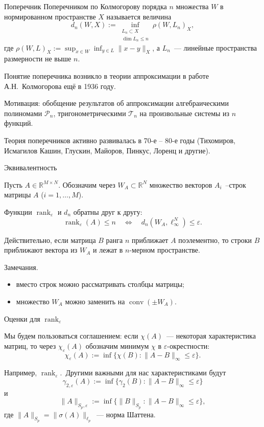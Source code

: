 \documentclass[handout]{beamer}
\renewcommand\le{\leqslant}
\newcommand\R{\mathbb R}
\newcommand\eps{\varepsilon}
\DeclareMathOperator{\conv}{conv}
\DeclareMathOperator{\rank}{rank}
\begin{document}
\begin{frame}{Поперечник}
Поперечником по Колмогорову порядка $n$ множества $W$ в нормированном
    пространстве $X$ называется величина
    \pause
$$
d_n(W,X) := \inf_{\substack{L_n\subset X\\\dim L_n\le n}} \rho(W,L_n)_X,
$$
где $\rho(W,L)_X := \sup_{x\in W}\inf_{y\in L} \|x-y\|_X$, а $L_n$~---
    линейные пространства размерности не выше $n$.
\pause\vspace{5pt}

Понятие поперечника возникло в теории аппроксимации в работе А.Н.~Колмогорова
    ещё в 1936 году.\pause

    Мотивация: обобщение результатов об аппроксимации алгебраическими полиномами
    $\mathcal P_n$, тригонометрическими $\mathcal T_n$ на произвольные системы
    из $n$ функций.
    \pause

    Теория поперечников активно развивалась в 70-е -- 80-е годы (Тихомиров, Исмагилов
    Кашин, Глускин, Майоров, Пинкус, Лоренц и другие).

\end{frame}


\begin{frame}{Эквивалентность}

    Пусть $A\in\R^{M\times N}$. Обозначим через $W_A\subset \R^N$ множество
    векторов $A_i$~--строк матрицы $A$ ($i=1,\ldots,M$). 
    \pause\vspace{5pt}
    
    Функции $\rank_\eps$ и $d_n$ обратны друг к другу:
    $$
    \rank_\eps(A) \le n \quad \Longleftrightarrow \quad d_n(W_A,\ell_\infty^N) \le
    \eps.
    $$
    \pause\vspace{5pt}

    Действительно, если матрица $B$ ранга $n$ приближает $A$ поэлементно, то строки $B$
    приближают вектора из $W_A$ и лежат в $n$-мерном пространстве.
    \pause

    Замечания.
    \begin{itemize}
        \item вместо строк можно рассматривать столбцы матрицы;\pause
        \item множество $W_A$ можно заменить на $\conv(\pm W_A)$.
    \end{itemize}
\end{frame}


\begin{frame}{Оценки для $\rank_\eps$}

Мы будем пользоваться соглашением: если $\chi(A)$~--- некоторая
характеристика матриц, то через $\chi_\eps(A)$ обозначим минимум $\chi$ в
$\eps$-окрестности:
$$
\chi_\eps(A) := \inf\{\chi(B)\colon \|A-B\|_\infty \le \eps\}.
$$
    \pause\vspace{5pt}

    Например, $\rank_\eps$.\pause~Другими важными для нас характеристиками будут
    $$
    \gamma_{2,\eps}(A) := \inf\{\gamma_2(B)\colon \|A-B\|_\infty\le\eps\}
    $$
    и \pause
    $$
    \|A\|_{S_p,\eps} := \inf\{\|B\|_{S_p}\colon \|A-B\|_\infty\le\eps\},
    $$
    где $\|A\|_{S_p} = \|\sigma(A)\|_{\ell_p}$~--- норма Шаттена.

\end{frame}
\end{document}
